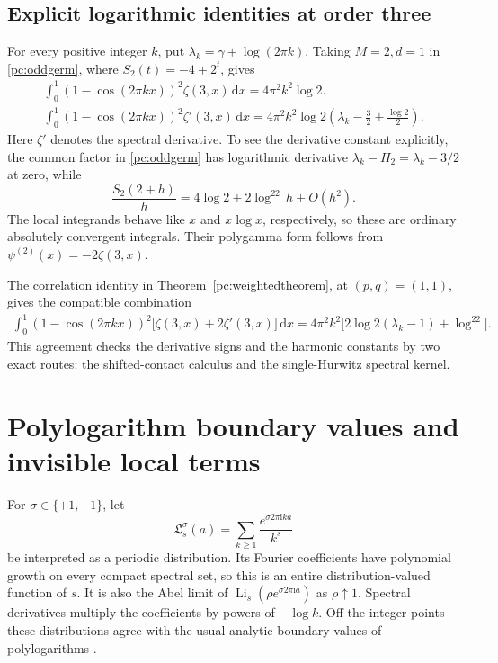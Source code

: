 \documentclass[11pt,a4paper]{article}
\numberwithin{equation}{section}
\theoremstyle{definition}
\newcommand{\dd}{\,\mathrm dx}
\newcommand{\ii}{\mathrm i}
\newcommand{\Li}{\operatorname{Li}}
\begin{document}
\subsection{Explicit logarithmic identities at order three}
For every positive integer $k$, put $\lambda_k=\gamma+\log(2\pi k)$. Taking $M=2,d=1$ in \eqref{pc:oddgerm}, where $S_2(t)=-4+2^t$, gives
\begin{align}
 \boxed{\ \int_0^1(1-\cos(2\pi kx))^2\zeta(3,x)\dd
       =4\pi^2k^2\log2.\ }\label{pc:zeta3}\\[4pt]
 \boxed{\ \int_0^1(1-\cos(2\pi kx))^2\zeta'(3,x)\dd
       =4\pi^2k^2\log2
          \left(\lambda_k-\frac32+\frac{\log2}{2}\right).\ }\label{pc:zeta3prime}
\end{align}
Here $\zeta'$ denotes the spectral derivative. To see the derivative constant explicitly, the common factor in \eqref{pc:oddgerm} has logarithmic derivative $\lambda_k-H_2=\lambda_k-3/2$ at zero, while
\[
 \frac{S_2(2+h)}h=4\log2+2\log^22\,h+O(h^2).
\]
The local integrands behave like $x$ and $x\log x$, respectively, so these are ordinary absolutely convergent integrals. Their polygamma form follows from $\psi^{(2)}(x)=-2\zeta(3,x)$.

The correlation identity in Theorem~\ref{pc:weightedtheorem}, at $(p,q)=(1,1)$, gives the compatible combination
\begin{align}\label{pc:correlation3}
 \int_0^1(1-\cos(2\pi kx))^2
       \bigl[\zeta(3,x)+2\zeta'(3,x)\bigr]\dd
 =4\pi^2k^2\bigl[2\log2(\lambda_k-1)+\log^22\bigr].
\end{align}
This agreement checks the derivative signs and the harmonic constants by two exact routes: the shifted-contact calculus and the single-Hurwitz spectral kernel.

\section{Polylogarithm boundary values and invisible local terms}\label{pc:polylogs}
For $\sigma\in\{+1,-1\}$, let
\begin{equation}\label{pc:periodicLi}
 \mathfrak L_s^\sigma(a)=\sum_{k\ge1}\frac{e^{\sigma2\pi\ii ka}}{k^s}
\end{equation}
be interpreted as a periodic distribution. Its Fourier coefficients have polynomial growth on every compact spectral set, so this is an entire distribution-valued function of $s$. It is also the Abel limit of $\Li_s(\rho e^{\sigma2\pi\ii a})$ as $\rho\uparrow1$. Spectral derivatives multiply the coefficients by powers of $-\log k$. Off the integer points these distributions agree with the usual analytic boundary values of polylogarithms \cite{pc:DLMFpoly}.
\end{document}
